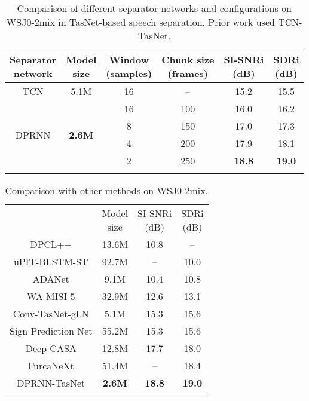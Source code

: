 \documentclass{article}
\def\thline{\noalign{\hrule height 1.0pt}}
\begin{document}
\begin{table}[!htbp]
	\small
	\centering
	\caption{Comparison of different separator networks and configurations on WSJ0-2mix in TasNet-based speech separation. Prior work used TCN-TasNet.}
	\label{tab:wsj0-tasnet}
	\begin{tabular}{c|c|c|c|c|c}
		\thline
		\thead{Separator \\ network} & \thead{Model \\ size} & \thead{Window \\ (samples)} & \thead{Chunk size \\ (frames)} & \thead{SI-SNRi \\ (dB)} & \thead{SDRi \\ (dB)} \\
		\hline
        TCN & 5.1M & 16 & -- & 15.2 & 15.5 \\
        \hline
        \multirow{4}{*}{DPRNN} & \multirow{4}{*}{\bf{2.6M}} & 16 & 100 & 16.0 & 16.2 \\
        & & 8 & 150 & 17.0 & 17.3 \\
        & & 4 & 200 & 17.9 & 18.1 \\
        & & 2 & 250 & \bf{18.8} & \bf{19.0} \\
		\thline
	\end{tabular}
\end{table}

\begin{table}[!htbp]
	\small
	\centering
	\caption{Comparison with other methods on WSJ0-2mix.}
	\label{tab:wsj0-compare}
	\begin{tabular}{c|c|c|c}
		\thline
		\thead{Method} & \thead{Model \\ size} & \thead{SI-SNRi\\ (dB)} & \thead{SDRi\\ (dB)} \\
		\thline
		DPCL++ \cite{isik2016single} & 13.6M & 10.8 & -- \\
		uPIT-BLSTM-ST \cite{kolbaek2017multitalker} & 92.7M &  -- & 10.0 \\
		ADANet \cite{luo2017speaker} & 9.1M & 10.4 & 10.8 \\
		WA-MISI-5 \cite{wang2018end} & 32.9M & 12.6 & 13.1 \\
		Conv-TasNet-gLN \cite{luo2019conv} & 5.1M & 15.3 & 15.6 \\
		Sign Prediction Net \cite{wang2019deep} & 55.2M & 15.3 & 15.6 \\
		Deep CASA \cite{liu2019divide} & 12.8M & 17.7 & 18.0 \\
		FurcaNeXt \cite{shi2019furcanext} & 51.4M & -- & 18.4 \\
		\hline
		DPRNN-TasNet & \bf{2.6M} & \bf{18.8} & \bf{19.0} \\
		\thline
	\end{tabular}
\end{table}
\end{document}
